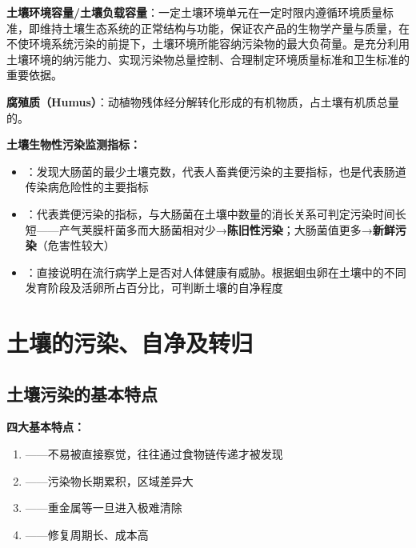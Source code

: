 \begin{defbox}
\textbf{土壤环境容量/土壤负载容量}：一定土壤环境单元在一定时限内遵循环境质量标准，即维持土壤生态系统的正常结构与功能，保证农产品的生物学产量与质量，在不使环境系统污染的前提下，土壤环境所能容纳污染物的最大负荷量。是充分利用土壤环境的纳污能力、实现污染物总量控制、合理制定环境质量标准和卫生标准的重要依据。

\textbf{腐殖质（Humus）}：动植物残体经分解转化形成的有机物质，占土壤有机质总量的。
\end{defbox}

\begin{tipbox}
\textbf{土壤生物性污染监测指标：}
\begin{itemize}[leftmargin=*]
    \item {}：发现大肠菌的最少土壤克数，代表人畜粪便污染的主要指标，也是代表肠道传染病危险性的主要指标
    \item {}：代表粪便污染的指标，与大肠菌在土壤中数量的消长关系可判定污染时间长短——产气荚膜杆菌多而大肠菌相对少→\textbf{陈旧性污染}；大肠菌值更多→\textbf{新鲜污染}（危害性较大）
    \item {}：直接说明在流行病学上是否对人体健康有威胁。根据蛔虫卵在土壤中的不同发育阶段及活卵所占百分比，可判断土壤的自净程度
\end{itemize}
\end{tipbox}

\section{土壤的污染、自净及转归}

\subsection{土壤污染的基本特点}

\begin{keybox}
\textbf{四大基本特点：}
\begin{enumerate}[leftmargin=*]
    \item {}——不易被直接察觉，往往通过食物链传递才被发现
    \item {}——污染物长期累积，区域差异大
    \item {}——重金属等一旦进入极难清除
    \item {}——修复周期长、成本高
\end{enumerate}
\end{keybox}

